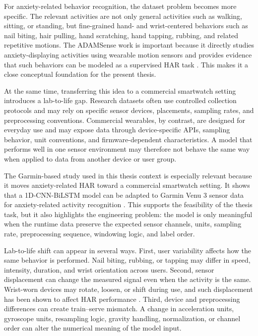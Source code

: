 For anxiety-related behavior recognition, the dataset problem becomes more specific. The relevant activities are not only general activities such as walking, sitting, or standing, but fine-grained hand- and wrist-centered behaviors such as nail biting, hair pulling, hand scratching, hand tapping, rubbing, and related repetitive motions. The ADAMSense work is important because it directly studies anxiety-displaying activities using wearable motion sensors and provides evidence that such behaviors can be modeled as a supervised HAR task \cite{khan2021adamsense}. This makes it a close conceptual foundation for the present thesis.

At the same time, transferring this idea to a commercial smartwatch setting introduces a lab-to-life gap. Research datasets often use controlled collection protocols and may rely on specific sensor devices, placements, sampling rates, and preprocessing conventions. Commercial wearables, by contrast, are designed for everyday use and may expose data through device-specific APIs, sampling behavior, unit conventions, and firmware-dependent characteristics. A model that performs well in one sensor environment may therefore not behave the same way when applied to data from another device or user group.

The Garmin-based study used in this thesis context is especially relevant because it moves anxiety-related HAR toward a commercial smartwatch setting. It shows that a 1D-CNN-BiLSTM model can be adapted to Garmin Venu 3 sensor data for anxiety-related activity recognition \cite{oleh2025recognition}. This supports the feasibility of the thesis task, but it also highlights the engineering problem: the model is only meaningful when the runtime data preserve the expected sensor channels, units, sampling rate, preprocessing sequence, windowing logic, and label order.

Lab-to-life shift can appear in several ways. First, user variability affects how the same behavior is performed. Nail biting, rubbing, or tapping may differ in speed, intensity, duration, and wrist orientation across users. Second, sensor displacement can change the measured signal even when the activity is the same. Wrist-worn devices may rotate, loosen, or shift during use, and such displacement has been shown to affect HAR performance \cite{wang2024enhancing}. Third, device and preprocessing differences can create train--serve mismatch. A change in acceleration units, gyroscope units, resampling logic, gravity handling, normalization, or channel order can alter the numerical meaning of the model input.

